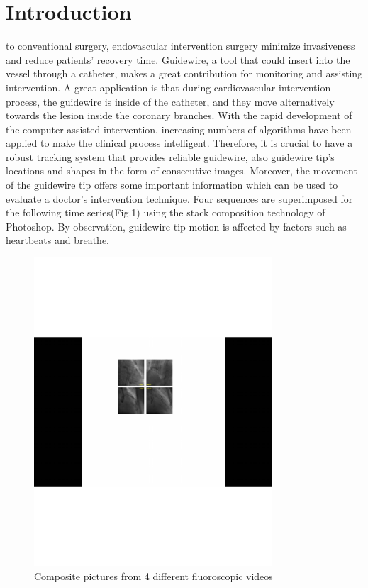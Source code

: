 \documentclass[journal]{IEEEtran}
\begin{document}
\IEEEpeerreviewmaketitle



\section{Introduction}
to conventional surgery, endovascular intervention surgery minimize invasiveness and reduce patients' recovery time. Guidewire, a tool that could insert into the vessel through a catheter, makes a great contribution for monitoring and assisting intervention. A great application is that during cardiovascular intervention process, the guidewire is inside of the catheter, and they move alternatively towards the lesion inside the coronary branches. With the rapid development of the computer-assisted intervention, increasing numbers of algorithms have been applied to make the clinical process intelligent. Therefore, it is crucial to have a robust tracking system that provides reliable guidewire, also guidewire tip's locations and shapes in the form of consecutive images. Moreover, the movement of the guidewire tip offers some important information which can be used to evaluate a doctor's intervention technique. Four sequences are superimposed for the following time series(Fig.1) using the stack composition technology of Photoshop. By observation, guidewire tip motion is affected by factors such as heartbeats and breathe. 

\begin{figure}[!hbtp] 
	\centering
	\includegraphics[width=3.5in]{figures/figure1}
		\caption{Composite pictures from 4 different fluoroscopic videos} 
	\label{fig:mcmthesis-logo} 
\end{figure}
\end{document}
